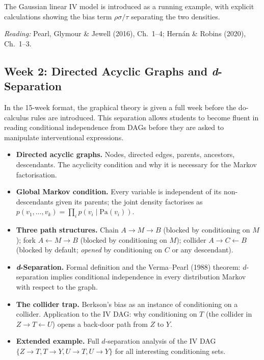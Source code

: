 \documentclass[12pt]{article}
\begin{document}
The Gaussian linear IV model is introduced as a running example, with
explicit calculations showing the bias term $\rho\sigma/\tau$ separating
the two densities.

\smallskip
\noindent\textit{Reading:} Pearl, Glymour \& Jewell (2016), Ch.~1--4;
Hern\'an \& Robins (2020), Ch.~1--3.

\subsection{Week 2: Directed Acyclic Graphs and \textit{d}-Separation}

In the 15-week format, the graphical theory is given a full week before
the do-calculus rules are introduced. This separation allows students to
become fluent in reading conditional independence from DAGs before they
are asked to manipulate interventional expressions.

\begin{itemize}
  \item \textbf{Directed acyclic graphs.}
    Nodes, directed edges, parents, ancestors, descendants. The acyclicity
    condition and why it is necessary for the Markov factorisation.

  \item \textbf{Global Markov condition.}
    Every variable is independent of its non-descendants given its parents;
    the joint density factorises as
    $p(v_1,\ldots,v_k) = \prod_i p(v_i \mid \mathrm{Pa}(v_i))$.

  \item \textbf{Three path structures.}
    Chain $A \to M \to B$ (blocked by conditioning on $M$);
    fork $A \leftarrow M \rightarrow B$ (blocked by conditioning on $M$);
    collider $A \to C \leftarrow B$ (blocked by default; \emph{opened} by
    conditioning on $C$ or any descendant).

  \item \textbf{\textit{d}-Separation.}
    Formal definition and the Verma--Pearl (1988) theorem: $d$-separation
    implies conditional independence in every distribution Markov with
    respect to the graph.

  \item \textbf{The collider trap.}
    Berkson's bias as an instance of conditioning on a collider. Application
    to the IV DAG: why conditioning on $T$ (the collider in
    $Z \to T \leftarrow U$) opens a back-door path from $Z$ to $Y$.

  \item \textbf{Extended example.}
    Full $d$-separation analysis of the IV DAG
    $\{Z \to T, T \to Y, U \to T, U \to Y\}$ for all interesting
    conditioning sets.
\end{itemize}
\end{document}
